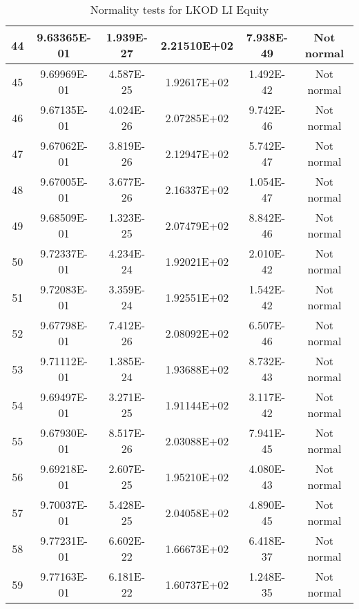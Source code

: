 \begin{table}[h]
\begin{tabular}{|c|c|c|c|c|c|}
		44 & 9.63365E-01 & 1.939E-27 & 2.21510E+02 & 7.938E-49 & Not normal\\\hline
		45 & 9.69969E-01 & 4.587E-25 & 1.92617E+02 & 1.492E-42 & Not normal\\\hline
		46 & 9.67135E-01 & 4.024E-26 & 2.07285E+02 & 9.742E-46 & Not normal\\\hline
		47 & 9.67062E-01 & 3.819E-26 & 2.12947E+02 & 5.742E-47 & Not normal\\\hline
		48 & 9.67005E-01 & 3.677E-26 & 2.16337E+02 & 1.054E-47 & Not normal\\\hline
		49 & 9.68509E-01 & 1.323E-25 & 2.07479E+02 & 8.842E-46 & Not normal\\\hline
		50 & 9.72337E-01 & 4.234E-24 & 1.92021E+02 & 2.010E-42 & Not normal\\\hline
		51 & 9.72083E-01 & 3.359E-24 & 1.92551E+02 & 1.542E-42 & Not normal\\\hline
		52 & 9.67798E-01 & 7.412E-26 & 2.08092E+02 & 6.507E-46 & Not normal\\\hline
		53 & 9.71112E-01 & 1.385E-24 & 1.93688E+02 & 8.732E-43 & Not normal\\\hline
		54 & 9.69497E-01 & 3.271E-25 & 1.91144E+02 & 3.117E-42 & Not normal\\\hline
		55 & 9.67930E-01 & 8.517E-26 & 2.03088E+02 & 7.941E-45 & Not normal\\\hline
		56 & 9.69218E-01 & 2.607E-25 & 1.95210E+02 & 4.080E-43 & Not normal\\\hline
		57 & 9.70037E-01 & 5.428E-25 & 2.04058E+02 & 4.890E-45 & Not normal\\\hline
		58 & 9.77231E-01 & 6.602E-22 & 1.66673E+02 & 6.418E-37 & Not normal\\\hline
		59 & 9.77163E-01 & 6.181E-22 & 1.60737E+02 & 1.248E-35 & Not normal\\\hline
	\end{tabular}
	\caption{Normality tests for LKOD LI Equity}
	\label{tab:normality_tests_LKOD_LI}
\end{table}

